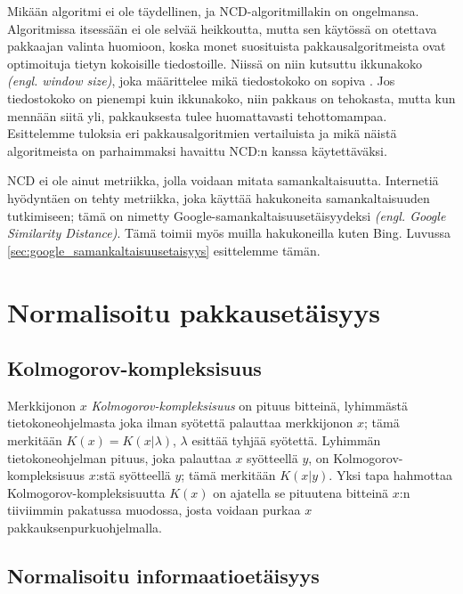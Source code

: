 \documentclass[12pt,finnish]{tktltiki2}
\theoremstyle{definition}
\theoremstyle{remark}
\newcommand{\engl}[1]{\emph{(engl. #1)}}
\newcommand{\kolmogorov}{Kolmogorov-kompleksisuus}
\begin{document}
  Mikään algoritmi ei ole täydellinen, ja NCD-algoritmillakin on ongelmansa.
  Algoritmissa itsessään ei ole selvää heikkoutta, mutta sen käytössä on otettava pakkaajan valinta huomioon, koska monet suosituista pakkausalgoritmeista ovat optimoituja tietyn kokoisille tiedostoille.
  Niissä on niin kutsuttu ikkunakoko \engl{window size}, joka määrittelee mikä tiedostokoko on sopiva \cite{cebrian2005common}.
  Jos tiedostokoko on pienempi kuin ikkunakoko, niin pakkaus on tehokasta, mutta kun mennään siitä yli, pakkauksesta tulee huomattavasti tehottomampaa.
  Esittelemme tuloksia eri pakkausalgoritmien vertailuista ja mikä näistä algoritmeista on parhaimmaksi havaittu NCD:n kanssa käytettäväksi.


\label{par:intro-5}
  NCD ei ole ainut metriikka, jolla voidaan mitata samankaltaisuutta.
  Internetiä hyödyntäen on tehty metriikka, joka käyttää hakukoneita samankaltaisuuden tutkimiseen; tämä on nimetty Google-samankaltaisuusetäisyydeksi \engl{Google Similarity Distance}.
  Tämä toimii myös muilla hakukoneilla kuten Bing. Luvussa \ref{sec:google_samankaltaisuusetaisyys} esittelemme tämän.


\section{Normalisoitu pakkausetäisyys} %
\label{sec:normalisoitu_pakkausetaisyys}
  \subsection{\kolmogorov} %
\label{sub:kolmogorov_kompleksisuus}

  Merkkijonon $x$ \emph{\kolmogorov} on pituus bitteinä, lyhimmästä tietokoneohjelmasta joka ilman syötettä palauttaa merkkijonon $x$; tämä merkitään $K(x)=K(x|\lambda)$, $\lambda$ esittää tyhjää syötettä.
  Lyhimmän tietokoneohjelman pituus, joka palauttaa $x$ syötteellä $y$, on \kolmogorov{} $x$:stä syötteellä $y$; tämä merkitään $K(x|y)$.
  Yksi tapa hahmottaa Kolmogorov-kompleksisuutta $K(x)$ on ajatella se pituutena bitteinä $x$:n tiiviimmin pakatussa muodossa, josta voidaan purkaa $x$ pakkauksenpurkuohjelmalla.

\subsection{Normalisoitu informaatioetäisyys} %
\label{sub:normalisoitu_informaatioetaisyys}
\end{document}
